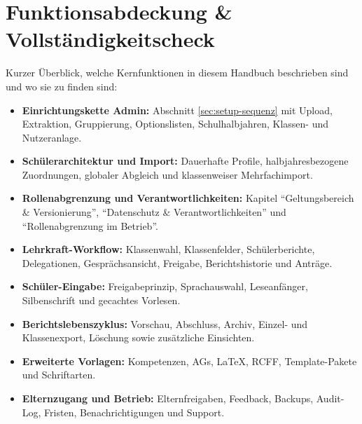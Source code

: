 \documentclass[12pt,a4paper]{article}
\begin{document}
\section{Funktionsabdeckung \& Vollständigkeitscheck}
Kurzer Überblick, welche Kernfunktionen in diesem Handbuch beschrieben sind und wo sie zu finden sind:
\begin{itemize}
  \item \textbf{Einrichtungskette Admin:} Abschnitt \ref{sec:setup-sequenz} mit Upload, Extraktion, Gruppierung, Optionslisten, Schulhalbjahren, Klassen- und Nutzeranlage.
  \item \textbf{Schülerarchitektur und Import:} Dauerhafte Profile, halbjahresbezogene Zuordnungen, globaler Abgleich und klassenweiser Mehrfachimport.
  \item \textbf{Rollenabgrenzung und Verantwortlichkeiten:} Kapitel \enquote{Geltungsbereich \& Versionierung}, \enquote{Datenschutz \& Verantwortlichkeiten} und \enquote{Rollenabgrenzung im Betrieb}.
  \item \textbf{Lehrkraft-Workflow:} Klassenwahl, Klassenfelder, Schülerberichte, Delegationen, Gesprächsansicht, Freigabe, Berichtshistorie und Anträge.
  \item \textbf{Schüler-Eingabe:} Freigabeprinzip, Sprachauswahl, Leseanfänger, Silbenschrift und gecachtes Vorlesen.
  \item \textbf{Berichtslebenszyklus:} Vorschau, Abschluss, Archiv, Einzel- und Klassenexport, Löschung sowie zusätzliche Einsichten.
  \item \textbf{Erweiterte Vorlagen:} Kompetenzen, AGs, LaTeX, RCFF, Template-Pakete und Schriftarten.
  \item \textbf{Elternzugang und Betrieb:} Elternfreigaben, Feedback, Backups, Audit-Log, Fristen, Benachrichtigungen und Support.
\end{itemize}
\end{document}
